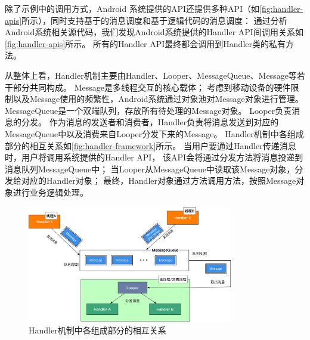 除了示例中的调用方式，Android 系统提供的API\cite{HandlerA26:online}还提供多种API（如\autoref{fig:handler-apis}所示），同时支持基于的消息调度和基于逻辑代码的消息调度：
 通过分析Android系统相关源代码，我们发现Android系统提供的Handler API间调用关系如\autoref{fig:handler-apis}所示。
 所有的Handler API最终都会调用到Handler类的私有方法。


从整体上看，Handler机制主要由Handler、Looper、MessageQueue、Message等若干部分共同构成。
 Message是多线程交互的核心载体；
考虑到移动设备的硬件限制以及Message使用的频繁性，Android系统通过对象池对Message对象进行管理。
MessageQueue是一个双端队列，存放所有待处理的Message对象。
Looper负责消息的分发。
作为消息的发送者和消费者，Handler负责将消息发送到对应的MessageQueue中以及消费来自Looper分发下来的Message。
Handler机制中各组成部分的相互关系如\autoref{fig:handler-framework}所示。
当用户要通过Handler传递消息时，用户将调用系统提供的Handler API，
该API会将通过分发方法将消息投递到消息队列MessageQueue中；
当Looper从MessageQueue中读取该Message对象，分发给对应的Handler对象；
最终，Handler对象通过方法调用方法，按照Message对象进行业务逻辑处理。
\begin{figure}[!ht]
	\centering
	\includegraphics[width=0.8\textwidth]{./Figures/Handler-framework.png}
	\caption{ Handler机制中各组成部分的相互关系}
	\label{fig:handler-framework}
\end{figure}

